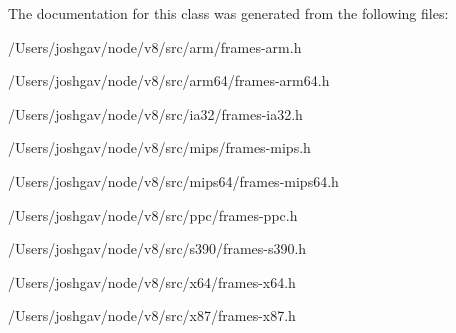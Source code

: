 The documentation for this class was generated from the following files\+:\begin{DoxyCompactItemize}
\item 
/\+Users/joshgav/node/v8/src/arm/frames-\/arm.\+h\item 
/\+Users/joshgav/node/v8/src/arm64/frames-\/arm64.\+h\item 
/\+Users/joshgav/node/v8/src/ia32/frames-\/ia32.\+h\item 
/\+Users/joshgav/node/v8/src/mips/frames-\/mips.\+h\item 
/\+Users/joshgav/node/v8/src/mips64/frames-\/mips64.\+h\item 
/\+Users/joshgav/node/v8/src/ppc/frames-\/ppc.\+h\item 
/\+Users/joshgav/node/v8/src/s390/frames-\/s390.\+h\item 
/\+Users/joshgav/node/v8/src/x64/frames-\/x64.\+h\item 
/\+Users/joshgav/node/v8/src/x87/frames-\/x87.\+h\end{DoxyCompactItemize}
